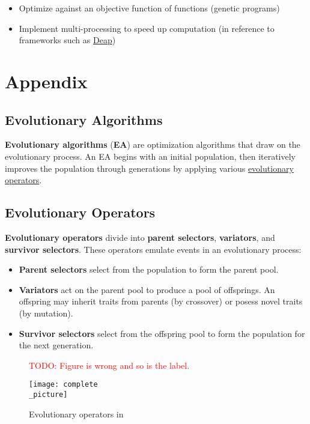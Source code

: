 \documentclass{article}
\begin{document}
\begin{itemize}
    \item Optimize against an objective function of functions (genetic programs)
    \item Implement multi-processing to speed up computation (in reference to frameworks such as \href{https://deap.readthedocs.io/en/master/}{Deap})
\end{itemize}
\section{Appendix}

\subsection{Evolutionary Algorithms}
\label{sec:evalg}
\textbf{Evolutionary algorithms} (\textbf{EA}) are optimization algorithms that draw on the evolutionary process. An EA begins with an initial population, then iteratively improves the population through generations by applying various \hyperref[sec:evop]{evolutionary operators}.

\subsection{Evolutionary Operators}
\label{sec:evop}
\textbf{Evolutionary operators} divide into \textbf{parent selectors}, \textbf{variators}, and \textbf{survivor selectors}. These operators emulate events in an evolutionary process:

\begin{itemize}
    \item \textbf{Parent selectors} select from the population to form the parent pool.
    \item \textbf{Variators} act on the parent pool to produce a pool of offsprings. An offspring may inherit traits from parents (by crossover) or posess novel traits (by mutation).
    \item \textbf{Survivor selectors} select from the offspring pool to form the population for the next generation.
\end{itemize}

\begin{figure}[h]
    \textcolor{red}{TODO: Figure is wrong and so is the label.}
    \caption{Evolutionary operators in}
    \texttt{[image: complete\\\_picture]}    
    \centering
\end{figure}
\end{document}
